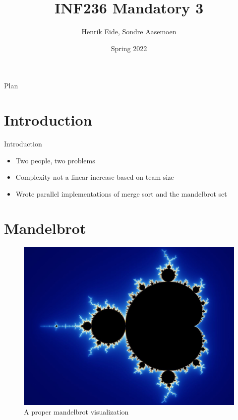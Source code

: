 \documentclass[presentation]{beamer}
\author{Henrik Eide, Sondre Aasemoen}
\date{Spring 2022}
\title{INF236 Mandatory 3}
\begin{document}
\maketitle
\begin{frame}{Plan}
\tableofcontents
\end{frame}

\section{Introduction}

\begin{frame}{Introduction}
  \begin{itemize}
    \item Two people, two problems 
    \item Complexity not a linear increase based on team size
    \item Wrote parallel implementations of merge sort and the mandelbrot set
  \end{itemize}
\end{frame}

\section{Mandelbrot}

\begin{frame}
  \begin{figure}[htbp]
    \centering
    \includegraphics[width=.9\linewidth]{./figures/mandelbrot.jpg}
    \caption{A proper mandelbrot visualization}
  \end{figure}
\end{frame}
\end{document}
